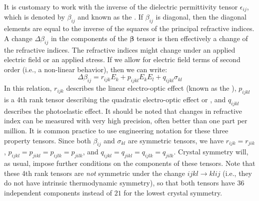 It is customary to work with the inverse of the dielectric permittivity tensor $\epsilon_{ij}$, which is denoted by $\beta_{ij}$ and  known as the .   If $\beta_{ij}$ is diagonal, then the diagonal elements are equal to the inverse of the squares of the principal refractive indices. A change $\Delta\beta_{ij}$ in the components of the $\bm{\beta}$ tensor is then effectively a change of the refractive indices. The refractive indices might change under an applied electric field or an applied stress.  If we allow for electric field terms of second order (i.e., a non-linear behavior), then we can write:
\begin{equation}
	\Delta \beta_{ij} = r_{ijk}E_k + p_{ijkl}E_kE_l + q_{ijkl}\sigma_{kl}
\end{equation}
In this relation, $r_{ijk}$ describes the linear electro-optic effect (known as the ), $p_{ijkl}$ is a 4th rank tensor describing the quadratic electro-optic effect or , and $q_{ijkl}$ describes the photoelastic effect. It should be noted that changes in refractive index can be measured with very high precision, often better than one part per million. It is common practice to use engineering notation for these three property tensors. Since both $\beta_{ij}$ and $\sigma_{kl}$ are symmetric tensors, we have $r_{ijk}=r_{jik}$, $p_{ijkl}=p_{jikl}=p_{ijlk}=p_{jilk}$, and $q_{ijkl}=q_{jikl}=q_{ijlk}=q_{jilk}$.  Crystal symmetry will, as usual, impose further conditions on the components of these tensors.  Note that these 4th rank tensors are \textit{not} symmetric under the change $ijkl\rightarrow klij$ (i.e., they do not have intrinsic thermodynamic symmetry), so that both tensors have $36$ independent components instead of $21$ for the lowest crystal symmetry.

